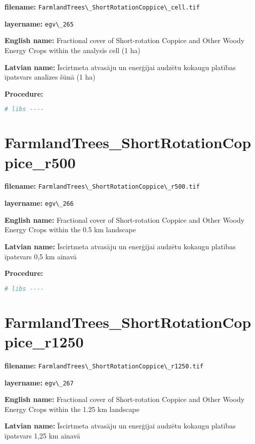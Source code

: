 \documentclass[
]{book}
\newcommand{\passthrough}[1]{#1}
\begin{document}
\textbf{filename:} \passthrough{\lstinline!FarmlandTrees\_ShortRotationCoppice\_cell.tif!}

\textbf{layername:} \passthrough{\lstinline!egv\_265!}

\textbf{English name:} Fractional cover of Short-rotation Coppice and Other Woody Energy Crops within the analysis cell (1 ha)

\textbf{Latvian name:} Īscirtmeta atvasāju un enerģijai audzētu kokaugu platības īpatsvars analīzes šūnā (1 ha)

\textbf{Procedure:}

\begin{lstlisting}[language=R]
# libs ----
\end{lstlisting}

\section{FarmlandTrees\_ShortRotationCoppice\_r500}\label{ch06.266}

\textbf{filename:} \passthrough{\lstinline!FarmlandTrees\_ShortRotationCoppice\_r500.tif!}

\textbf{layername:} \passthrough{\lstinline!egv\_266!}

\textbf{English name:} Fractional cover of Short-rotation Coppice and Other Woody Energy Crops within the 0.5 km landscape

\textbf{Latvian name:} Īscirtmeta atvasāju un enerģijai audzētu kokaugu platības īpatsvars 0,5 km ainavā

\textbf{Procedure:}

\begin{lstlisting}[language=R]
# libs ----
\end{lstlisting}

\section{FarmlandTrees\_ShortRotationCoppice\_r1250}\label{ch06.267}

\textbf{filename:} \passthrough{\lstinline!FarmlandTrees\_ShortRotationCoppice\_r1250.tif!}

\textbf{layername:} \passthrough{\lstinline!egv\_267!}

\textbf{English name:} Fractional cover of Short-rotation Coppice and Other Woody Energy Crops within the 1.25 km landscape

\textbf{Latvian name:} Īscirtmeta atvasāju un enerģijai audzētu kokaugu platības īpatsvars 1,25 km ainavā
\end{document}
